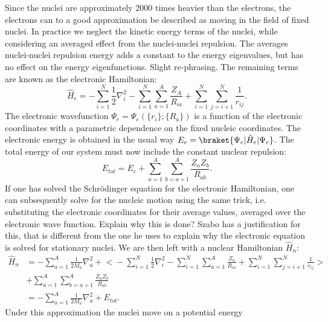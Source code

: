 \par
Since the nuclei are approximately 2000 times heavier
than the electrons, the electrons can to a good approximation
be described as moving in the field of fixed nuclei. In practice we
neglect the kinetic energy terms of the nuclei, while considering
an averaged effect from the nuclei-nuclei repulsion.
The averages nuclei-nuclei repulsion energy
adds a constant to the energy
eigenvalues, but has no effect on the energy eigenfunctions. {\color{red} Slight re-phrasing.}
The remaining terms are known as the electronic Hamiltonian:
\begin{equation}
    \hat{H}_e = -\sum_{i=1}^N \frac{1}{2} \nabla_i^2
    -\sum_{i=1}^N \sum_{a=1}^A \frac{Z_A}{R_{ia}}
    +\sum_{i=1}^N \sum_{j=i+1}^N \frac{1}{r_{ij}} .
\end{equation}
The electronic wavefunction $\Psi_e = \Psi_e(\{r_i\}; \{R_a\})$
is a function of the electronic coordinates with a parametric dependence
on the fixed nucleic coordinates. The electronic energy
is obtained in the usual way $E_{e} = \braket{\Psi_e | \hat{H}_e |
\Psi_e} $. The total energy of our system
must now include the constant nuclear repulsion:
\begin{equation}
 E_{tot} = E_{e} + \sum_{a=1}^A \sum_{b=a+1}^A
    \frac{Z_a Z_b}{R_{ab}} .
\end{equation}
If one has solved the Schr\"{o}dinger equation for the electronic
Hamiltonian, one can subsequently solve for the nucleic motion
using the same trick, i.e. substituting the electronic coordinates
for their average values, averaged over the electronic wave function. {\color{red} Explain why this is done? Szabo has a justification for this, that is different from the one he uses to explain why the electronic equation is solved for stationary nuclei.}
We are then left with a nuclear Hamiltonian $\hat{H}_n$:
\begin{equation}
    \begin{split}
        \hat{H}_n
        &= -\sum_{a=1}^A \frac{1}{2 M_a} \nabla_a^2
        + \biggl< -\sum_{i=1}^N \frac{1}{2} \nabla_i^2
        - \sum_{i=1}^N \sum_{a=1}^A \frac{Z_a}{R_{ia}}
        + \sum_{i=1}^N \sum_{j=i+1}^N \frac{1}{r_{ij}}
        \biggr> \\
        &+ \sum_{a=1}^A \sum_{b=a+1}^A
        \frac{Z_a Z_b}{R_{ab}} \\
        &= -\sum_{a=1}^A \frac{1}{2 M_a} \nabla_a^2
        + E_{tot} .
    \end{split}
\end{equation}
Under this approximation the nuclei move on a potential energy
